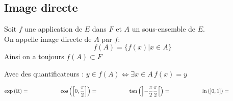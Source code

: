 \documentclass[a4paper, 11pt]{article}
\begin{document}


\subsection{Image directe }


\begin{defi}
	Soit $f$ une application de $E$ dans $F$ et  $A$ un sous-ensemble de $E$.\\
	On appelle image directe de $A$ par $f$:
	$$f(A)=\{ f(x)| x\in A\}$$
	Ainsi on a toujours $f(A)\subset F$
\end{defi}

Avec des quantificateurs :
$y\in f(A)\Longleftrightarrow  \exists x\in A \, f(x)=y$





\begin{exemples}
	$$\exp{(\mathbb{R})}=\hspace{2cm} \cos{\left( \left\lbrack 0,\displaystyle\frac{\pi}{2}\right\rbrack \right)}=\hspace{2cm} \tan{\left( \left\rbrack -\displaystyle\frac{\pi}{2} \displaystyle\frac{\pi}{2}\right\lbrack \right)}=\hspace{2cm} \ln{\left( \rbrack 0,1\rbrack \right)}=\hspace{2cm}$$
\end{exemples}
\end{document}
